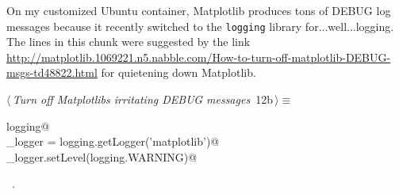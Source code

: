 \documentclass[11.5pt]{report}
\begin{document}
\newchunk On my customized Ubuntu container, Matplotlib produces tons of DEBUG log messages because  
it recently switched to the \verb|logging| library for...well...logging. 
The lines in this chunk were suggested by the link 
\url{http://matplotlib.1069221.n5.nabble.com/How-to-turn-off-matplotlib-DEBUG-msgs-td48822.html} 
for quietening down Matplotlib.  


\begin{flushleft} \small
\begin{minipage}{\linewidth}\label{scrap2}\raggedright\small
{} $\langle\,${\itshape Turn off Matplotlibs irritating DEBUG messages}\nobreak\ {\footnotesize {12b}}$\,\rangle\equiv$
\vspace{-1ex}
\begin{list}{}{} \item
\mbox{}\verb@import logging@\\
\mbox{}\verb@mpl_logger = logging.getLogger('matplotlib')@\\
\mbox{}\verb@mpl_logger.setLevel(logging.WARNING)@\\
\mbox{}\verb@@{\NWsep}
\end{list}
\vspace{-1.5ex}
\footnotesize
\begin{list}{}{\setlength{\itemsep}{-\parsep}\setlength{\itemindent}{-\leftmargin}}
\item \NWtxtMacroRefIn\ .

\item{}
\end{list}
\end{minipage}\vspace{4ex}
\end{flushleft}
\end{document}
